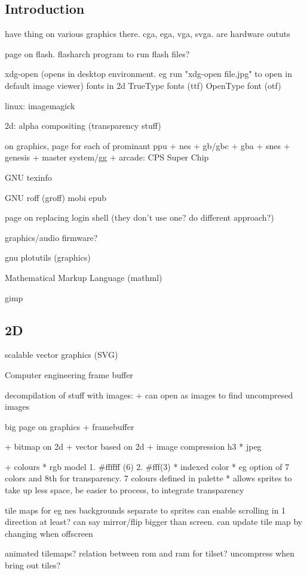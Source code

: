 
\subsection{Introduction}

have thing on various graphics there. cga, ega, vga, svga. are hardware oututs

page on flash. flasharch program to run flash files?

xdg-open (opens in desktop environment. eg run "xdg-open file.jpg" to open in default image viewer)
fonts in 2d
TrueType fonts (ttf)
OpenType font (otf)

linux: imagemagick

2d: alpha compositing (transparency stuff)


on graphics, page for each of prominant ppu
+ nes
+ gb/gbc
+ gba
+ snes
+ genesis
+ master system/gg
+ arcade: CPS Super Chip

GNU texinfo


GNU roff (groff)
mobi
epub

page on replacing login shell (they don't use one? do different approach?)

graphics/audio firmware?

gnu plotutils (graphics)

Mathematical Markup Language (mathml)

gimp

\subsection{2D}
scalable vector graphics (SVG)

Computer engineering frame buffer

decompilation of stuff with images:
+ can open as images to find uncompresed images

big page on graphics
+ framebuffer

+ bitmap on 2d
+ vector based on 2d
+ image compression h3
  * jpeg

+ colours
  * rgb model
    1. \#ffffff (6)
    2. \#fff(3)
  * indexed color
    * eg option of 7 colors and 8th for transparency. 7 colours defined in palette
    * allows sprites to take up less space, be easier to process, to integrate transparency

tile maps for eg nes backgrounds
separate to sprites
can enable scrolling in 1 direction at least?
can say mirror/flip
bigger than screen. can update tile map by changing when offscreen

animated tilemaps?
relation between rom and ram for tilset? uncompress when bring out tiles?

